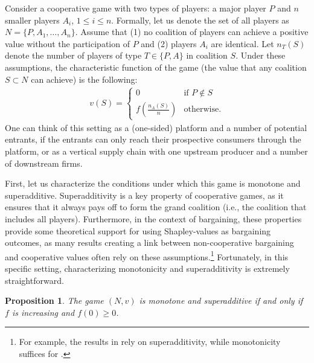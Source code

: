 \documentclass[a4paper]{article}
\newtheorem{proposition}{Proposition}
\begin{document}
Consider a cooperative game with two types of players: a major player $P$ and $n$ smaller players $A_i$, $1 \leq i \leq n$.
Formally, let us denote the set of all players as $N = \{P, A_1, \dots, A_n\}$.
Assume that (1) no coalition of players can achieve a positive value without the participation of $P$ and (2) players $A_i$ are identical.
Let $n_T(S)$ denote the number of players of type $T \in \{P, A\}$ in coalition $S$.
Under these assumptions, the characteristic function of the game (the value that any coalition $S \subset N$ can achieve) is the following:
\begin{align*}
    v(S) = \begin{cases}
        0                              & \text{if } P \notin S \\
        f\left(\frac{n_A(S)}{n}\right) & \text{otherwise}.
    \end{cases}
\end{align*}
One can think of this setting as a (one-sided) platform and a number of potential entrants, if the entrants can only reach their prospective consumers through the platform, or as a vertical supply chain with one upstream producer and a number of downstream firms.

First, let us characterize the conditions under which this game is monotone and superadditive.
Superadditivity is a key property of cooperative games, as it ensures that it always pays off to form the grand coalition (i.e., the coalition that includes all players).
Furthermore, in the context of bargaining, these properties provide some theoretical support for using Shapley-values as bargaining outcomes, as many results creating a link between non-cooperative bargaining and cooperative values often rely on these assumptions.\footnote{
    For example, the results in \textcite{gul1989bargaining} rely on superadditivity, while monotonicity suffices for \textcite[]{hart1996bargaining}.
}
Fortunately, in this specific setting, characterizing monotonicity and superadditivity is extremely straightforward.
\begin{proposition}
    \label{prop:monotone}
    The game $(N, v)$ is monotone and superadditive if and only if $f$ is increasing and $f(0) \geq 0$.
\end{proposition}
\end{document}
